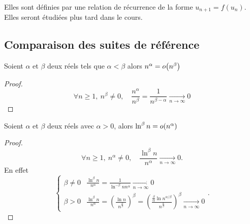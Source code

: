 Elles sont définies par une relation de récurrence de la forme \(u_{n+1} = f(u_n)\). Elles seront étudiées plus tard dans le cours.

\subsection{Comparaison des suites de référence}

\begin{prop}
  Soient \(\alpha\) et \(\beta\) deux réels tels que \(\alpha < \beta\) alors \(n^\alpha = o\mathopen{}\left(n^\beta\right)\)
\end{prop}
\begin{proof}
  \begin{equation}
      \forall n \geqslant 1, \ n^\beta \neq 0, \quad \frac{n^\alpha}{n^\beta} = \frac{1}{n^{\beta-\alpha}} \underset{n\to \infty}{\longrightarrow} 0
  \end{equation}
\end{proof}

\begin{prop}
  Soient \(\alpha\) et \(\beta\) deux réels avec \(\alpha>0\), alors \(\ln^\beta n = o\mathopen{}\left(n^\alpha\right)\)
\end{prop}
\begin{proof}
  \begin{equation}
    \forall n \geqslant 1, \ n^\alpha \neq 0, \quad \frac{\ln^\beta n}{n^\alpha} \underset{n\to \infty}{\longrightarrow} 0.
  \end{equation}
En effet
\begin{equation}
  \begin{cases}
    \beta \neq 0 & \frac{\ln^\beta n}{n^\alpha} = \frac{1}{\ln^{-\beta} n n^\alpha} \underset{n\to \infty}{\longrightarrow} 0 \\
    \beta > 0 & \frac{\ln^\beta n}{n^\alpha} = \left(\frac{\ln n}{n^{\frac{\alpha}{\beta}}}\right)^\beta = \left(\frac{\frac{\beta}{\alpha}\ln n^{\alpha/\beta}}{n^{\frac{\alpha}{\beta}}}\right)^\beta \underset{n\to \infty}{\longrightarrow} 0
  \end{cases}.
\end{equation}
\end{proof}

